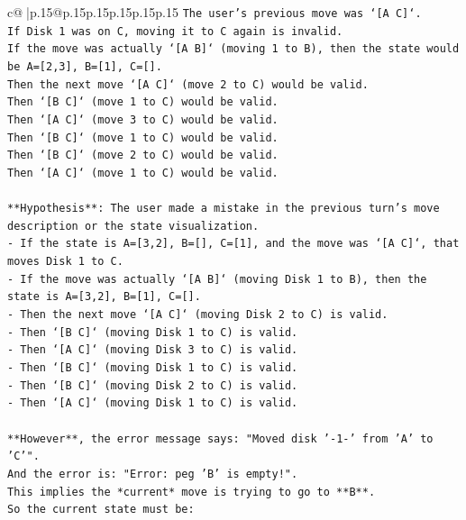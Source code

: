 \documentclass{article}
\begin{document}
{\begin{supertabular}{c@{$\;$}|p{.15\linewidth}@{}p{.15\linewidth}p{.15\linewidth}p{.15\linewidth}p{.15\linewidth}p{.15\linewidth}}
{{{\texttt{The user's previous move was `{[}A C{]}`.} \\
\texttt{If Disk 1 was on C, moving it to C again is invalid.} \\
\texttt{If the move was actually `{[}A B{]}` (moving 1 to B), then the state would be A={[}2,3{]}, B={[}1{]}, C={[}{]}.} \\
\texttt{Then the next move `{[}A C{]}` (move 2 to C) would be valid.} \\
\texttt{Then `{[}B C{]}` (move 1 to C) would be valid.} \\
\texttt{Then `{[}A C{]}` (move 3 to C) would be valid.} \\
\texttt{Then `{[}B C{]}` (move 1 to C) would be valid.} \\
\texttt{Then `{[}B C{]}` (move 2 to C) would be valid.} \\
\texttt{Then `{[}A C{]}` (move 1 to C) would be valid.} \\
\\ 
\texttt{**Hypothesis**: The user made a mistake in the previous turn's move description or the state visualization.} \\
\texttt{{-} If the state is A={[}3,2{]}, B={[}{]}, C={[}1{]}, and the move was `{[}A C{]}`, that moves Disk 1 to C.} \\
\texttt{{-} If the move was actually `{[}A B{]}` (moving Disk 1 to B), then the state is A={[}3,2{]}, B={[}1{]}, C={[}{]}.} \\
\texttt{{-} Then the next move `{[}A C{]}` (moving Disk 2 to C) is valid.} \\
\texttt{{-} Then `{[}B C{]}` (moving Disk 1 to C) is valid.} \\
\texttt{{-} Then `{[}A C{]}` (moving Disk 3 to C) is valid.} \\
\texttt{{-} Then `{[}B C{]}` (moving Disk 1 to C) is valid.} \\
\texttt{{-} Then `{[}B C{]}` (moving Disk 2 to C) is valid.} \\
\texttt{{-} Then `{[}A C{]}` (moving Disk 1 to C) is valid.} \\
\\ 
\texttt{**However**, the error message says: "Moved disk '{-}1{-}' from 'A' to 'C'".} \\
\texttt{And the error is: "Error: peg 'B' is empty!".} \\
\texttt{This implies the *current* move is trying to go to **B**.} \\
\texttt{So the current state must be:} \\
}}}
\end{supertabular}}
\end{document}
